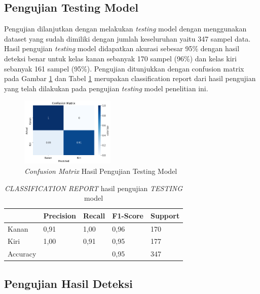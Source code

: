 \subsection{Pengujian Testing Model}
\label{subsec:PengujianTesting}

Pengujian dilanjutkan dengan melakukan \emph{testing} model dengan menggunakan dataset yang sudah dimiliki dengan jumlah keseluruhan yaitu 347 sampel data. Hasil pengujian \emph{testing} model didapatkan akurasi sebesar 95\% dengan hasil deteksi benar untuk kelas kanan sebanyak 170 sampel (96\%) dan kelas kiri sebanyak 161 sampel (95\%). Pengujian ditunjukkan dengan confusion matrix pada Gambar \ref{fig:HasilTesting} dan Tabel \ref{tab:ClassificationReport} merupakan classification report dari hasil pengujian yang telah dilakukan pada pengujian \emph{testing} model penelitian ini.

\begin{figure} [ht]
  \centering
  \includegraphics[width=0.4\textwidth]{gambar/cm normalized.png}
  \caption{\emph{Confusion Matrix} Hasil Pengujian Testing Model}
  \label{fig:HasilTesting}
\end{figure}

\begin{table} [ht]
  \caption{\emph{CLASSIFICATION REPORT} hasil pengujian \emph{TESTING} model}
  \label{tab:ClassificationReport}
  \centering
  \begin{tabular}{lllll}
    \toprule
     & Precision & Recall & F1-Score & Support  \\
    \midrule
    Kanan       & 0,91    & 1,00    & 0,96    & 170         \\
    Kiri        & 1,00    & 0,91    & 0,95    & 177           \\
    Accuracy    &         &         & 0,95    & 347            \\
    \bottomrule
  \end{tabular}
\end{table}

\subsection{Pengujian Hasil Deteksi}
\label{subsec:PengujianDeteksi}

